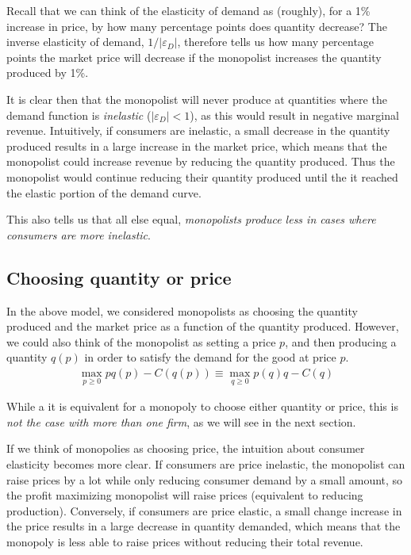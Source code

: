 Recall that we can think of the elasticity of demand as (roughly), for a 1\% increase in price, by how many percentage points does quantity decrease? The inverse elasticity of demand, $1/|\varepsilon_D|$, therefore tells us how many percentage points the market price will decrease if the monopolist increases the quantity produced by 1\%. 

It is clear then that the monopolist will never produce at quantities where the demand function is \emph{inelastic} ($|\varepsilon_D| < 1$), as this would result in negative marginal revenue. Intuitively, if consumers are inelastic, a small decrease in the quantity produced results in a large increase in the market price, which means that the monopolist could increase revenue by reducing the quantity produced. Thus the monopolist would continue reducing their quantity produced until the it reached the elastic portion of the demand curve.

This also tells us that all else equal, \emph{monopolists produce less in cases where consumers are more inelastic}. 

\subsection*{Choosing quantity or price}
In the above model, we considered monopolists as choosing the quantity produced and the market price as a function of the quantity produced. However, we could also think of the monopolist as setting a price $p$, and then producing a quantity $q(p)$ in order to satisfy the demand for the good at price $p$.
\begin{align*}
    \max_{p \geq 0} p q(p) - C(q(p)) \equiv \max_{q \geq 0} p(q) q - C(q)
\end{align*}

While a it is equivalent for a monopoly to choose either quantity or price, this is \emph{not the case with more than one firm}, as we will see in the next section. 

If we think of monopolies as choosing price, the intuition about consumer elasticity becomes more clear. If consumers are price inelastic, the monopolist can raise prices by a lot while only reducing consumer demand by a small amount, so the profit maximizing monopolist will raise prices (equivalent to reducing production). Conversely, if consumers are price elastic, a small change increase in the price results in a large decrease in quantity demanded, which means that the monopoly is less able to raise prices without reducing their total revenue.

